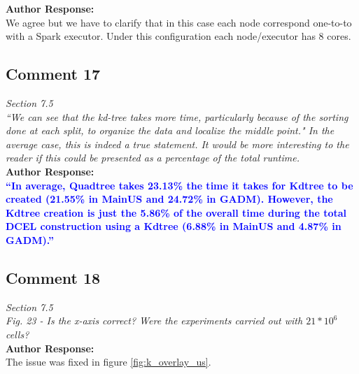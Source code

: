 \documentclass[10pt]{article}
\begin{document}
\textbf{Author Response:}\\
We agree but we have to clarify that in this case each node correspond one-to-to with a Spark executor.  Under this configuration each node/executor has 8 cores.

\subsection*{Comment 17}
\textit{
Section 7.5\\
``We can see that the kd-tree takes more time, particularly because of the sorting done at each split, to organize the data and localize the middle point." In the average case, this is indeed a true statement. It would be more interesting to the reader if this could be presented as a percentage of the total runtime.
} \\

\textbf{Author Response:}\\

\textbf{\textcolor{blue}{
``In average, Quadtree takes 23.13\% the time it takes for Kdtree to be created (21.55\% in MainUS and 24.72\% in GADM). However, the Kdtree creation is just the 5.86\% of the overall time during the total DCEL construction using a Kdtree (6.88\% in MainUS and 4.87\% in GADM).''
}}

\subsection*{Comment 18}
\textit{
Section 7.5\\
Fig. 23 - Is the x-axis correct? Were the experiments carried out with $21*10^6$ cells?
}\\

\textbf{Author Response:}\\
The issue was fixed in figure \ref{fig:k_overlay_us}.
\end{document}
